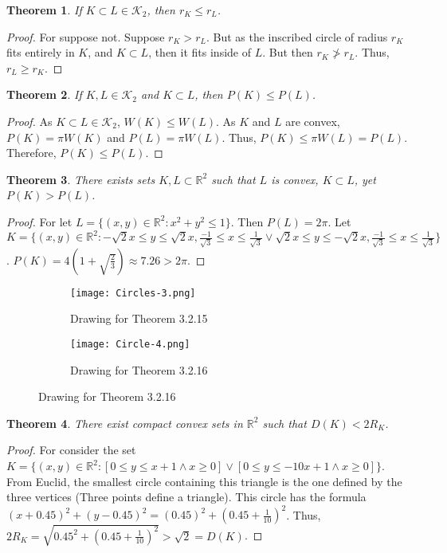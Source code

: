 \documentclass[crop=false,class=book]{standalone}
\theoremstyle{mystyle}
\newtheorem{theorem}{Theorem}[section]
\begin{document}
\begin{theorem}
If $K\subset L \in \mathscr{K}_2$, then $r_K \leq r_L$.
\end{theorem}
\begin{proof}
For suppose not. Suppose $r_K> r_L$. But as the inscribed circle of radius $r_K$ fits entirely in $K$, and $K\subset L$, then it fits inside of $L$. But then $r_K \not > r_L$. Thus, $r_L \geq r_K$.
\end{proof}
\begin{theorem}
If $K,L\in \mathscr{K}_2$ and $K\subset L$, then $P(K)\leq P(L)$.
\end{theorem}
\begin{proof}
As $K\subset L\in  \mathscr{K}_2$, $W(K)\leq W(L)$. As $K$ and $L$ are convex, $P(K)=\pi W(K)$ and $P(L)=\pi W(L)$. Thus, $P(K) \leq \pi W(L) = P(L)$. Therefore, $P(K)\leq P(L)$.
\end{proof}
\begin{theorem}
There exists sets $K,L\subset \mathbb{R}^2$ such that $L$ is convex, $K\subset L$, yet $P(K)>P(L)$.
\end{theorem}
\begin{proof}
For let $L = \{(x,y)\in \mathbb{R}^2: x^2 + y^2 \leq 1\}$. Then $P(L) = 2\pi$. Let $K = \{(x,y)\in \mathbb{R}^2: -\sqrt{2}x\leq y \leq \sqrt{2}x,\frac{-1}{\sqrt{3}} \leq x \leq \frac{1}{\sqrt{3}} \lor \sqrt{2}x\leq y \leq -\sqrt{2}x,\frac{-1}{\sqrt{3}} \leq x \leq \frac{1}{\sqrt{3}} \}$. $P(K) = 4(1+ \sqrt{\frac{2}{3}}) \approx 7.26>2\pi$.
\end{proof}
\begin{figure}[H]
  \begin{subfigure}[b]{0.49\textwidth}
     \centering
    \texttt{[image: Circles-3.png]}
    \caption{Drawing for Theorem 3.2.15}
  \end{subfigure}
  \begin{subfigure}[b]{0.49\textwidth}
    \centering
    \texttt{[image: Circle-4.png]}
    \caption{Drawing for Theorem 3.2.16}
  \end{subfigure}
\end{figure}
\begin{theorem}
There exist compact convex sets in $\mathbb{R}^2$ such that $D(K) < 2R_K$.
\end{theorem}
\begin{proof}
For consider the set $K=\{(x,y)\in \mathbb{R}^2: [0\leq y\leq x+1 \land x\geq 0]\lor [0\leq y\leq -10x+1\land x\geq 0]\}$. From Euclid, the smallest circle containing this triangle is the one defined by the three vertices (Three points define a triangle). This circle has the formula $(x+0.45)^2+(y-0.45)^2 = (0.45)^2 +(0.45+\frac{1}{10})^2$. Thus, $2R_K = \sqrt{0.45^2 +(0.45+\frac{1}{10})^2} > \sqrt{2} = D(K)$.
\end{proof}
\end{document}
